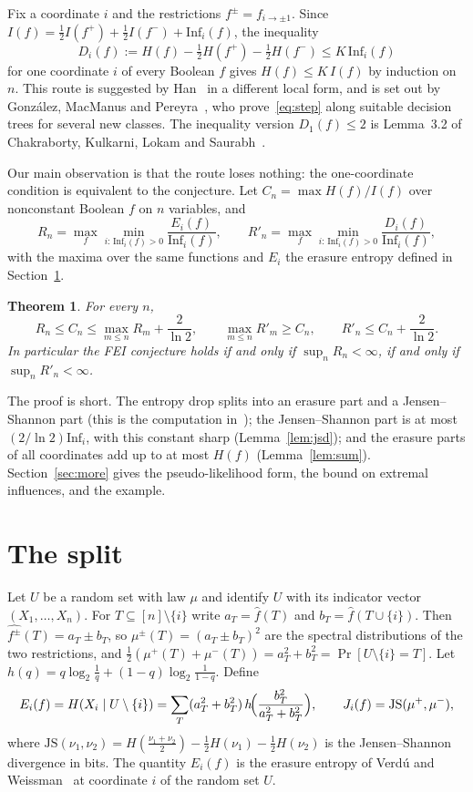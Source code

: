 \documentclass[11pt]{amsart}
\newtheorem{theorem}{Theorem}
\theoremstyle{remark}
\newcommand{\Inf}{\mathrm{Inf}}
\begin{document}
Fix a coordinate $i$ and the restrictions $f^{\pm}=f_{i\to\pm1}$. Since $I(f)=\tfrac12 I(f^+)+\tfrac12 I(f^-)+\Inf_i(f)$,
the inequality
\begin{equation}\label{eq:step}
D_i(f):=H(f)-\tfrac12 H(f^+)-\tfrac12 H(f^-)\le K\,\Inf_i(f)
\end{equation}
for one coordinate $i$ of every Boolean $f$ gives $H(f)\le K\,I(f)$ by induction on $n$. This route is suggested by
Han~\cite[(3.17) and the discussion after Remark 3.2]{Han} in a different local form, and is set out by Gonz\'alez, MacManus and Pereyra~\cite{GMP},
who prove~\eqref{eq:step} along suitable decision trees for several new classes. The inequality version
$D_1(f)\le 2$ is Lemma~3.2 of Chakraborty, Kulkarni, Lokam and Saurabh~\cite{CKLS}.

Our main observation is that the route loses nothing: the one-coordinate condition is equivalent to the conjecture.
Let $C_n=\max H(f)/I(f)$ over nonconstant Boolean $f$ on $n$ variables, and
\[
R_n=\max_f \min_{i:\,\Inf_i(f)>0}\frac{E_i(f)}{\Inf_i(f)},\qquad
R'_n=\max_f \min_{i:\,\Inf_i(f)>0}\frac{D_i(f)}{\Inf_i(f)},
\]
with the maxima over the same functions and $E_i$ the erasure entropy defined in Section~\ref{sec:split}.

\begin{theorem}\label{thm:main}
For every $n$,
\[
R_n\le C_n\le \max_{m\le n}R_m+\frac{2}{\ln 2},\qquad
\max_{m\le n} R'_m \ge C_n,\qquad R'_n\le C_n+\frac{2}{\ln 2}.
\]
In particular the FEI conjecture holds if and only if $\sup_n R_n<\infty$, if and only if $\sup_n R'_n<\infty$.
\end{theorem}

The proof is short. The entropy drop splits into an erasure part and a Jensen--Shannon part (this is the computation
in~\cite[Appendix B]{GMP}); the Jensen--Shannon part is at most $(2/\ln2)\Inf_i$, with this constant sharp
(Lemma~\ref{lem:jsd}); and the erasure parts of all coordinates add up to at most $H(f)$
(Lemma~\ref{lem:sum}). Section~\ref{sec:more} gives the pseudo-likelihood form, the bound on extremal influences, and
the example.

\section{The split}\label{sec:split}

Let $U$ be a random set with law $\mu$ and identify $U$ with its indicator vector $(X_1,\dots,X_n)$. For
$T\subseteq[n]\setminus\{i\}$ write $a_T=\hat f(T)$ and $b_T=\hat f(T\cup\{i\})$. Then
$\widehat{f^{\pm}}(T)=a_T\pm b_T$, so $\mu^{\pm}(T)=(a_T\pm b_T)^2$ are the spectral distributions of the two
restrictions, and $\tfrac12(\mu^+(T)+\mu^-(T))=a_T^2+b_T^2=\Pr[U\setminus\{i\}=T]$. Let
$h(q)=q\log_2\frac1q+(1-q)\log_2\frac1{1-q}$. Define
\[
E_i(f)=H(X_i\mid U\setminus\{i\})=\sum_T (a_T^2+b_T^2)\,h\!\Bigl(\frac{b_T^2}{a_T^2+b_T^2}\Bigr),
\qquad
J_i(f)=\mathrm{JS}(\mu^+,\mu^-),
\]
where $\mathrm{JS}(\nu_1,\nu_2)=H(\tfrac{\nu_1+\nu_2}2)-\tfrac12H(\nu_1)-\tfrac12H(\nu_2)$ is the Jensen--Shannon divergence in bits. The quantity $E_i(f)$ is the erasure entropy of Verd\'u and
Weissman~\cite{VW08} at coordinate $i$ of the random set $U$.
\end{document}
